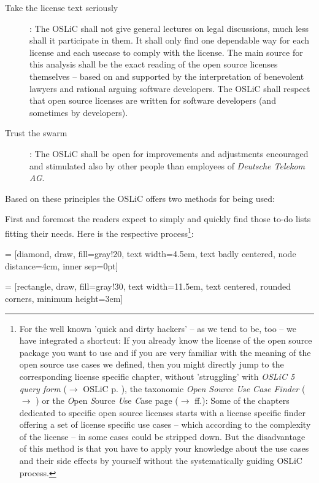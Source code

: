 \begin{description}
  \item[Take the license text seriously]: The OSLiC shall not give general
  lectures on legal discussions, much less shall it participate in them. It
  shall only find one dependable way for each license and each usecase to comply
  with the license. The main source for this analysis shall be the exact reading
  of the open source licenses themselves -- based on and supported by the
  interpretation of benevolent lawyers and rational arguing software
  developers. The OSLiC shall respect that open source licenses are written for
  software developers (and sometimes by developers).
  
  \item[Trust the swarm]: The OSLiC shall be open for improvements and
  adjustments encouraged and stimulated also by other people than employees of
  \emph{Deutsche Telekom AG}.
\end{description}

Based on these principles the OSLiC offers two methods for being used:

First and foremost the readers expect to simply and quickly find those to-do
lists fitting their needs. Here is the respective process\footnote{For the well
known 'quick and dirty hackers' -- as we tend to be, too -- we have integrated a
shortcut: If you already know the license of the open source package you want to
use and if you are very familiar with the meaning of the open source use cases
we defined, then you might directly jump to the corresponding license specific
chapter, without 'struggling' with \textit{OSLiC 5 query form} ($\rightarrow$
OSLiC p. \pageref{OSLiCStandardFormForGatheringInformation}), the taxonomic
\textit{Open Source Use Case Finder} ($\rightarrow$
\pageref{OSLiCUseCaseFinder}) or the \textit{O}pen \textit{S}ource \textit{U}se
\textit{C}ase page ($\rightarrow$ \pageref{OSUCList}ff.): Some of the chapters
dedicated to specific open source licenses starts with a license specific
finder offering a set of license specific use cases -- which according to the
complexity of the license -- in some cases could be stripped down. But the
disadvantage of this method is that you have to apply your knowledge about the
use cases and their side effects by yourself without the systematically guiding
OSLiC process.}:

 = [diamond, draw, fill=gray!20, 
    text width=4.5em, text badly centered, node distance=4cm, inner sep=0pt]

 = [rectangle, draw, fill=gray!30, 
    text width=11.5em, text centered, rounded corners, minimum height=3em]
 
